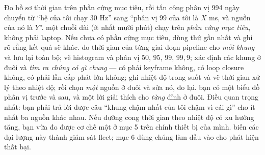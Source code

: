 \documentclass[../../vslam.tex]{subfiles}
\begin{document}
\begin{duan}{Đo hồ sơ thời gian trên phần cứng mục tiêu, rồi tấn công phân vị 99}{4 ngày}
\dmt chuyển từ ``hệ của tôi chạy \(30\) Hz'' sang ``phân vị \(99\) của tôi là \(X\) ms, và nguồn của nó là \(Y\)''.
\ddl một chuỗi dài (ít nhất mười phút) chạy trên \emph{phần cứng mục tiêu}, không phải laptop. Nếu chưa có phần cứng mục tiêu, dùng thứ gần nhất và ghi rõ rằng kết quả sẽ khác.
\dbc đo thời gian của từng giai đoạn pipeline cho \emph{mỗi khung} và lưu lại toàn bộ; vẽ histogram và phân vị \(50\), \(95\), \(99\), \(99{,}9\); xác định các khung ở đuôi và \emph{tìm ra chúng có gì chung} --- có phải keyframe không, có loop closure không, có phải lần cấp phát lớn không; ghi nhiệt độ trong suốt và vẽ thời gian xử lý theo nhiệt độ; rồi chọn \emph{một} nguồn ở đuôi và sửa nó, đo lại.
\dxk bạn có một biểu đồ phân vị trước và sau, và một lời giải thích cho \emph{từng} đỉnh ở đuôi. Điều quan trọng nhất: bạn phải trả lời được câu ``khung chậm nhất của tôi chậm vì cái gì'' cho ít nhất ba nguồn khác nhau. Nếu đường cong thời gian theo nhiệt độ có xu hướng tăng, bạn vừa đo được cơ chế một ở mục 5 trên chính thiết bị của mình.
\dnv {} biến các đại lượng này thành giám sát fleet;  mục 6 dùng chúng làm đầu vào cho phát hiện thất bại.
\end{duan}
\end{document}
